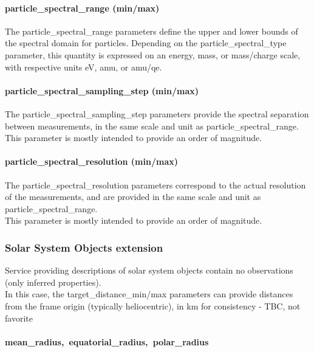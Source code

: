 \documentclass[11pt,a4paper]{ivoa}
\begin{document}
\paragraph{particle\_spectral\_range (min/max)}

The particle\_spectral\_range parameters define the upper and lower bounds of the spectral domain for particles. Depending on the particle\_spectral\_type parameter, this quantity is expressed on an energy, mass, or mass/charge scale, with respective units eV, amu, or amu/qe.

\paragraph{particle\_spectral\_sampling\_step (min/max)}

The particle\_spectral\_sampling\_step parameters provide the spectral separation between measurements, in the same scale and unit as particle\_spectral\_range.\\This parameter is mostly intended to provide an order of magnitude.

\paragraph{particle\_spectral\_resolution (min/max)}

The particle\_spectral\_resolution parameters correspond to the actual resolution of the measurements, and are provided in the same scale and unit as particle\_spectral\_range. \\This parameter is mostly intended to provide an order of magnitude.

\subsubsection{Solar System Objects extension\\}

Service providing descriptions of solar system objects contain no observations (only inferred properties).\\In this case, the target\_distance\_min/max parameters can provide distances from the frame origin (typically heliocentric), in km for consistency - TBC, not favorite

\paragraph{mean\_radius, equatorial\_radius, polar\_radius}
\end{document}
